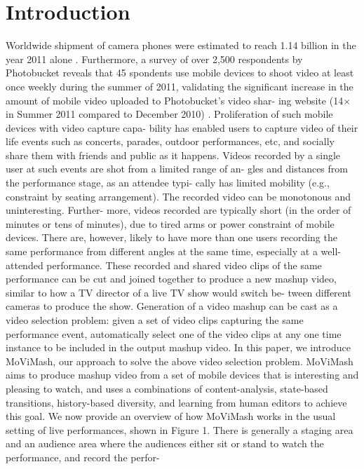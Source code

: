 \documentclass{sig-alternate}
\providecommand{\DIFadd}[1]{{\protect\color{blue}\uwave{#1}}} %
\providecommand{\DIFaddbegin}{} %
\providecommand{\DIFaddend}{} %
\begin{document}
\section{Introduction}
\DIFaddbegin \DIFadd{I am a new sentence.
}\DIFaddend Worldwide shipment of camera phones were estimated to reach
1.14 billion in the year 2011 alone \cite{salas:one}. Furthermore, a survey of
over 2,500 respondents by Photobucket reveals that 45%
spondents use mobile devices to shoot video at least once weekly
during the summer of 2011, validating the significant increase in
the amount of mobile video uploaded to Photobucket’s video shar-
ing website (14× in Summer 2011 compared to December 2010) \cite{salas:two}.
Proliferation of such mobile devices with video capture capa-
bility has enabled users to capture video of their life events such
as concerts, parades, outdoor performances, etc, and socially share
them with friends and public as it happens. Videos recorded by
a single user at such events are shot from a limited range of an-
gles and distances from the performance stage, as an attendee typi-
cally has limited mobility (e.g., constraint by seating arrangement).
The recorded video can be monotonous and uninteresting. Further-
more, videos recorded are typically short (in the order of minutes
or tens of minutes), due to tired arms or power constraint of mobile
devices. There are, however, likely to have more than one users
recording the same performance from different angles at the same
time, especially at a well-attended performance.
These recorded and shared video clips of the same performance
can be cut and joined together to produce a new mashup video,
similar to how a TV director of a live TV show would switch be-
tween different cameras to produce the show. Generation of a video
mashup can be cast as a video selection problem: given a set of
video clips capturing the same performance event, automatically
select one of the video clips at any one time instance to be included
in the output mashup video.
In this paper, we introduce MoViMash, our approach to solve
the above video selection problem. MoViMash aims to produce
mashup video from a set of mobile devices that is interesting and
pleasing to watch, and uses a combinations of content-analysis,
state-based transitions, history-based diversity, and learning from
human editors to achieve this goal.
We now provide an overview of how MoViMash works in the
usual setting of live performances, shown in Figure 1. There is
generally a staging area and an audience area where the audiences
either sit or stand to watch the performance, and record the perfor-
\end{document}
